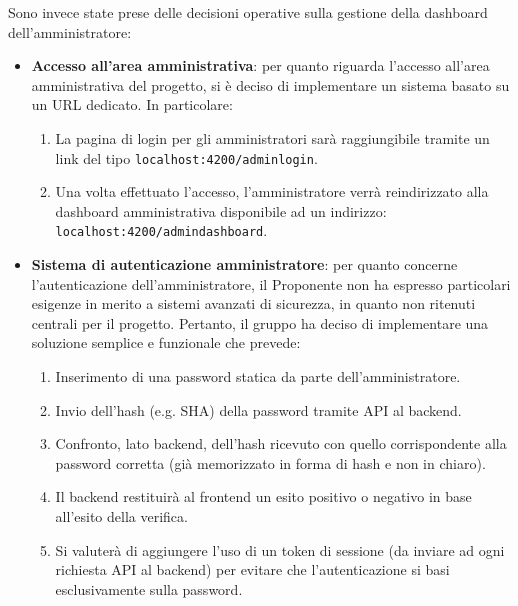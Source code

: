 Sono invece state prese delle decisioni operative sulla gestione della dashboard dell'amministratore:
\begin{itemize}
    \item \textbf{Accesso all'area amministrativa}: per quanto riguarda l'accesso all'area amministrativa del progetto, si è deciso di implementare un sistema basato su un URL dedicato. In particolare:
\begin{enumerate}
    \item La pagina di login per gli amministratori sarà raggiungibile tramite un link del tipo \texttt{localhost:4200/adminlogin}.
    \item Una volta effettuato l'accesso, l'amministratore verrà reindirizzato alla dashboard amministrativa disponibile ad un indirizzo: \texttt{localhost:4200/admindash\newline board}.
\end{enumerate}
\item \textbf{Sistema di autenticazione amministratore}: per quanto concerne l'autenticazione dell'amministratore, il Proponente non ha espresso particolari esigenze in merito a sistemi avanzati di sicurezza, in quanto non ritenuti centrali per il progetto. Pertanto, il gruppo ha deciso di implementare una soluzione semplice e funzionale che prevede:
\begin{enumerate}
    \item Inserimento di una password statica da parte dell'amministratore.
    \item Invio dell'hash (e.g. SHA) della password tramite API al backend.
    \item Confronto, lato backend, dell'hash ricevuto con quello corrispondente alla password corretta (già memorizzato in forma di hash e non in chiaro).
    \item Il backend restituirà al frontend un esito positivo o negativo in base all'esito della verifica.
    \item Si valuterà di aggiungere l'uso di un token di sessione (da inviare ad ogni richiesta API al backend) per evitare che l'autenticazione si basi esclusivamente sulla password. 
\end{enumerate}
\end{itemize}

